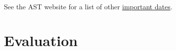\documentclass[titlepage]{article}
\newcommand\policy{../policy}
\begin{document}
See the AST website for a list of other \href{http://www.astheology.ns.ca/students/academic-dates.html}{important dates}.

\section{Evaluation}
\label{evaluation}



%
%
%
%
%
%



\end{document}
